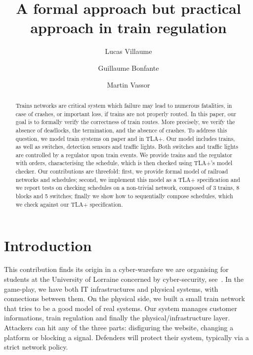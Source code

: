 \documentclass[runningheads]{llncs}
\begin{document}
%
\title{A formal approach but practical approach in train regulation}
%
%
\author{Lucas Villaume \and Guillaume Bonfante \and Martin Vassor}
%
%
%
\maketitle
%
\begin{abstract}
	Trains networks are critical system which failure may lead to numerous fatalities, in case of crashes, or important loss, if trains are not properly routed. 
	In this paper, our goal is to formally verify the correctness of train routes. More precisely, we verify the absence of deadlocks, the termination, and the absence of crashes.
	To address this question, we model train systems on paper and in TLA+. Our model includes trains, as well as switches, detection sensors and traffic lights. Both switches and traffic lights are controlled by a regulator upon train events. We provide trains and the regulator with orders, characterising the schedule, which is then checked using TLA+'s model checker.
	Our contributions are threefold: first, we provide formal model of railroad networks and schedules; second, we implement this model as a TLA+ specification and we report tests on checking schedules on a non-trivial network, composed of 3 trains, 8 blocks and 5 switches; finally we show how to sequentially compose schedules, which we check against our TLA+ specification.

\end{abstract}


\section{Introduction}
\label{sec:introduction}

This contribution finds its origin in a cyber-warefare we are organising for students at the University of Lorraine concerned by cyber-security, see~\cite{CHE}. In the game-play, we have both IT infrastructures and physical systems, with connections between them. On the physical side, we built a small train network that tries to be a good model of real systems.  Our system manages customer informations, train regulation and finally the physical/infrastructure layer. Attackers can hit any of the three parts: disfiguring the website, changing a platform or blocking a signal. Defenders will protect their system, typically via a strict network policy.
\end{document}
